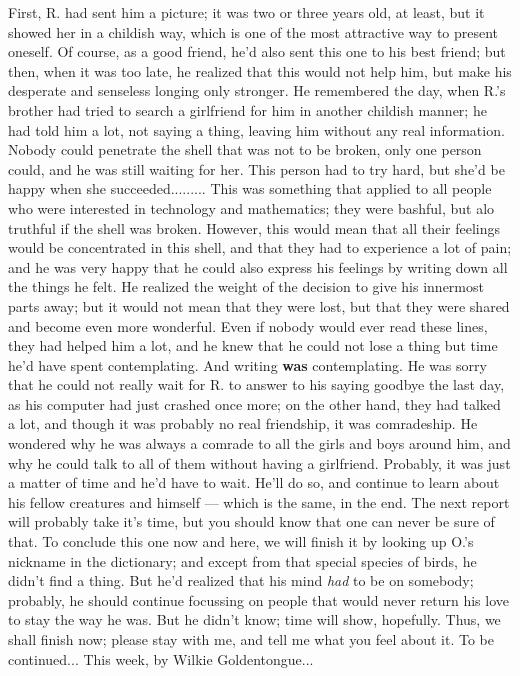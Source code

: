 First, R. had sent him a picture; it was two or three years old, at least, but it showed her in a childish way, which is one of the most attractive way to present oneself. Of course, as a good friend, he'd also sent this one to his best friend; but then, when it was too late, he realized that this would not help him, but make his desperate and senseless longing only stronger. 
He remembered the day, when R.'s brother had tried to search a girlfriend for him in another childish manner; he had told him a lot, not saying a thing, leaving him without any real information. Nobody could penetrate the shell that was not to be broken, only one person could, and he was still waiting for her. This person had to try hard, but she'd be happy when she succeeded.........
This was something that applied to all people who were interested in technology and mathematics; they were bashful, but alo truthful if the shell was broken. However, this would mean that all their feelings would be concentrated in this shell, and that they had to experience a lot of pain; and he was very happy that he could also express his feelings by writing down all the things he felt. 
He realized the weight of the decision to give his innermost parts away; but it would not mean that they were lost, but that they were shared and become even more wonderful. Even if nobody would ever read these lines, they had helped him a lot, and he knew that he could not lose a thing but time he'd have spent contemplating. 
And writing \textbf{was} contemplating. 
He was sorry that he could not really wait for R. to answer to his saying goodbye the last day, as his computer had just crashed once more; on the other hand, they had talked a lot, and though it was probably no real friendship, it was comradeship. He wondered why he was always a comrade to all the girls and boys around him, and why he could talk to all of them without having a girlfriend. 
Probably, it was just a matter of time and he'd have to wait. 
He'll do so, and continue to learn about his fellow creatures and himself --- which is the same, in the end. 
The next report will probably take it's time, but you should know that one can never be sure of that. 
To conclude this one now and here, we will finish it by looking up O.'s nickname in the dictionary; and except from that special species of birds, he didn't find a thing. 
But he'd realized that his mind \emph{had} to be on somebody; probably, he should continue focussing on people that would never return his love to stay the way he was. But he didn't know; time will show, hopefully. 
Thus, we shall finish now; please stay with me, and tell me what you feel about it. 
To be continued...
This week, by Wilkie Goldentongue...

